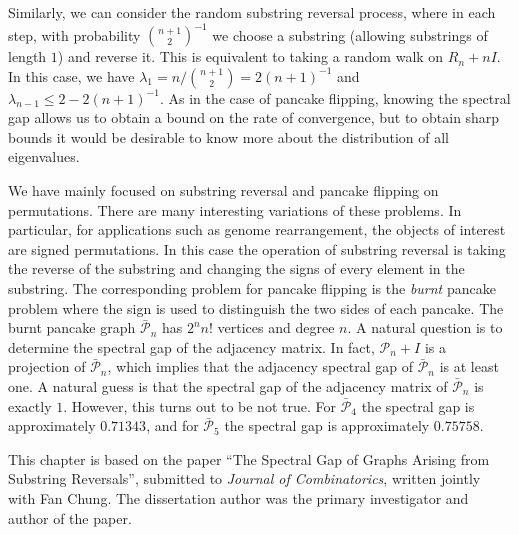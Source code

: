 Similarly, we can consider the random substring reversal process, where in each
step, with probability $\binom{n+1}{2}^{-1}$ we choose a substring (allowing substrings of length $1$) and reverse it.
This is equivalent to taking a random walk on $R_n+ nI$. 
In this case, we have $\lambda_1 = n/ \binom {n+1} 2= 2 (n+1)^{-1}$ and $\lambda_{n-1} \leq 2  - 2 (n+1)^{-1}$.   As in the case of 
pancake flipping, knowing the spectral gap allows us to obtain a bound on
the rate of convergence, but to obtain sharp bounds it would be desirable to
know more about the distribution of all eigenvalues.

We have mainly focused on substring reversal and pancake flipping on permutations. There are many
interesting variations of these problems. In particular, for applications such as genome
rearrangement, the objects of interest are signed permutations.  In this case the operation of
substring reversal is taking the reverse of the substring and changing the signs of every element in
the substring.  The corresponding problem for pancake flipping is the {\it burnt} pancake problem
where the sign is used to distinguish the two sides of each pancake.  The burnt pancake graph
$\bar{\mathcal P}_n$ has $2^n n!$ vertices and degree $n$.  A natural question is to determine
the spectral gap of the adjacency matrix.  In fact, $\mathcal{P}_n + I$ is a projection of
$\bar{\mathcal{P}}_n$, which implies that the adjacency spectral gap of $\bar{\mathcal{P}}_n$ is
at least one.  A natural guess is that the spectral gap of the adjacency matrix of
$\bar{\mathcal P}_n$ is exactly $1$. However, this
turns out to be not true. For $\bar{\mathcal P}_4$ the spectral gap is approximately $0.71343$,
and for $\bar{\mathcal P}_5$ the spectral gap is approximately $0.75758$.  



This chapter is based on the paper ``The Spectral Gap of Graphs Arising from Substring Reversals'',
submitted to \textit{Journal of Combinatorics}, written jointly with Fan Chung.  The dissertation
author was the primary investigator and author of the paper.
